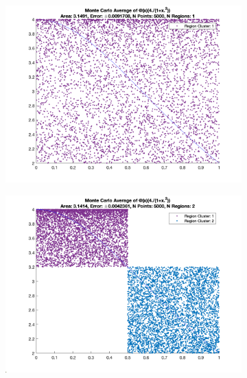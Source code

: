\documentclass[12pt]{article}
\begin{document}
\newpage

\begin{figure}[htp]
\centering

\begin{subfigure}{0.49\columnwidth}
\centering
\includegraphics[width=\textwidth]{problem_1_n_5000_reg_1.png}
\caption{}
\label{fig:time1}
\end{subfigure}\hfill
\begin{subfigure}{0.49\columnwidth}
\centering
\includegraphics[width=\textwidth]{problem_1_n_5000_reg_2.png}
\caption{}
\label{fig:time2}
\end{subfigure}

\medskip


\end{figure}
\end{document}
